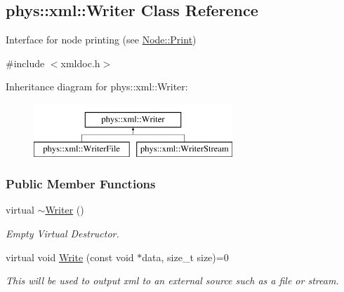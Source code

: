 \hypertarget{classphys_1_1xml_1_1Writer}{
\subsection{phys::xml::Writer Class Reference}
\label{classphys_1_1xml_1_1Writer}
}


Interface for node printing (see \hyperlink{classphys_1_1xml_1_1Node_adbe10968a804a94552e1dc8223744406}{Node::Print})  




{\ttfamily \#include $<$xmldoc.h$>$}

Inheritance diagram for phys::xml::Writer:\begin{figure}[H]
\begin{center}
\leavevmode
\includegraphics[height=2.000000cm]{classphys_1_1xml_1_1Writer}
\end{center}
\end{figure}
\subsubsection*{Public Member Functions}
\begin{DoxyCompactItemize}
\item 
\hypertarget{classphys_1_1xml_1_1Writer_a527c2e01738b1e570d08674eada21800}{
virtual \hyperlink{classphys_1_1xml_1_1Writer_a527c2e01738b1e570d08674eada21800}{$\sim$Writer} ()}
\label{classphys_1_1xml_1_1Writer_a527c2e01738b1e570d08674eada21800}

\begin{DoxyCompactList}\small\item\em Empty Virtual Destructor. \item\end{DoxyCompactList}\item 
virtual void \hyperlink{classphys_1_1xml_1_1Writer_ab6d4758ab53743f236eb64d5b2dd7e9e}{Write} (const void $\ast$data, size\_\-t size)=0
\begin{DoxyCompactList}\small\item\em This will be used to output xml to an external source such as a file or stream. \item\end{DoxyCompactList}\end{DoxyCompactItemize}


